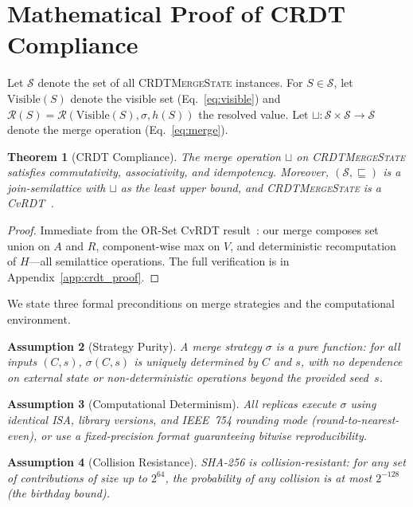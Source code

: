 \documentclass[10pt,letterpaper]{article}
\newcommand{\CMS}{\texorpdfstring{{\mdseries\upshape\textsc{CRDTMergeState}}}{CRDTMergeState}}
\newtheorem{theorem}{Theorem}
\newtheorem{assumption}[theorem]{Assumption}
\begin{document}
\section{Mathematical Proof of CRDT Compliance}\label{sec:proofs}

Let $\mathcal{S}$ denote the set of all \CMS{} instances.
For $S \in \mathcal{S}$, let $\mathrm{Visible}(S)$ denote the visible set (Eq.~\ref{eq:visible}) and $\mathcal{R}(S) = \mathcal{R}(\mathrm{Visible}(S), \sigma, h(S))$ the resolved value.
Let $\sqcup : \mathcal{S} \times \mathcal{S} \to \mathcal{S}$ denote the merge operation (Eq.~\ref{eq:merge}).

\begin{theorem}[CRDT Compliance]\label{thm:crdt}
The merge operation $\sqcup$ on \CMS{} satisfies commutativity, associativity, and idempotency.
Moreover, $(\mathcal{S}, \sqsubseteq)$ is a join-semilattice with $\sqcup$ as the least upper bound, and \CMS{} is a CvRDT~\cite{shapiro2011conflict}.
\end{theorem}

\begin{proof}
Immediate from the OR-Set CvRDT result~\cite{shapiro2011conflict, shapiro2011comprehensive}: our merge composes set union on $A$ and $R$, component-wise max on $V$, and deterministic recomputation of $H$---all semilattice operations.
The full verification is in Appendix~\ref{app:crdt_proof}.
\end{proof}

We state three formal preconditions on merge strategies and the computational environment.

\begin{assumption}[Strategy Purity]\label{ass:purity}
A merge strategy $\sigma$ is a \emph{pure function}: for all inputs $(C, s)$, $\sigma(C,s)$ is uniquely determined by $C$ and $s$, with no dependence on external state or non-deterministic operations beyond the provided seed~$s$.
\end{assumption}

\begin{assumption}[Computational Determinism]\label{ass:determinism}
All replicas execute $\sigma$ using identical ISA, library versions, and IEEE~754 rounding mode (round-to-nearest-even), or use a fixed-precision format guaranteeing bitwise reproducibility.
\end{assumption}

\begin{assumption}[Collision Resistance]\label{ass:collision}
SHA-256 is collision-resistant: for any set of contributions of size up to $2^{64}$, the probability of any collision is at most $2^{-128}$ (the birthday bound).
\end{assumption}
\end{document}

